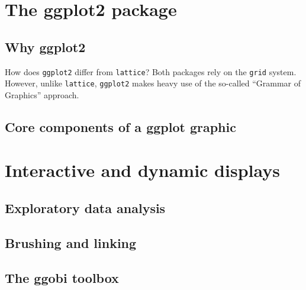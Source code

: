 \documentclass[a4paper,twoside]{book}
\renewcommand{\texttt}[1]{\lstinline{#1}}
\begin{document}
\chapter{The ggplot2 package}

\section{Why ggplot2}

How does \texttt{ggplot2} differ from \texttt{lattice}? Both packages rely
on the \texttt{grid} system. However, unlike \texttt{lattice},
\texttt{ggplot2} makes heavy use of the so-called ``Grammar of Graphics'' approach.\autocite{wilkinson05}


\section{Core components of a ggplot graphic}

\chapter{Interactive and dynamic displays}

\section{Exploratory data analysis}

\section{Brushing and linking}

\section{The ggobi toolbox}


\appendix
\backmatter

\printindex
\end{document}
